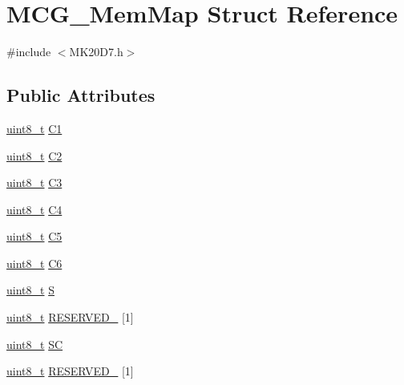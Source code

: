 \hypertarget{struct_m_c_g___mem_map}{}\section{M\+C\+G\+\_\+\+Mem\+Map Struct Reference}
\label{struct_m_c_g___mem_map}


{\ttfamily \#include $<$M\+K20\+D7.\+h$>$}

\subsection*{Public Attributes}
\begin{DoxyCompactItemize}
\item 
\hyperlink{_p_e___types_8h_aba7bc1797add20fe3efdf37ced1182c5}{uint8\+\_\+t} \hyperlink{struct_m_c_g___mem_map_a433a36d1aeb9d033b502ee263c1495a1}{C1}
\item 
\hyperlink{_p_e___types_8h_aba7bc1797add20fe3efdf37ced1182c5}{uint8\+\_\+t} \hyperlink{struct_m_c_g___mem_map_a7323696b9a1cb6631b8c04ffad3947e5}{C2}
\item 
\hyperlink{_p_e___types_8h_aba7bc1797add20fe3efdf37ced1182c5}{uint8\+\_\+t} \hyperlink{struct_m_c_g___mem_map_a58ca70b30279c98af3471abe38280f01}{C3}
\item 
\hyperlink{_p_e___types_8h_aba7bc1797add20fe3efdf37ced1182c5}{uint8\+\_\+t} \hyperlink{struct_m_c_g___mem_map_a3c5615d70ed3f2d3664de1a8fdbe9983}{C4}
\item 
\hyperlink{_p_e___types_8h_aba7bc1797add20fe3efdf37ced1182c5}{uint8\+\_\+t} \hyperlink{struct_m_c_g___mem_map_a0e385950fe0f38c82eae57eb4ea2aaf3}{C5}
\item 
\hyperlink{_p_e___types_8h_aba7bc1797add20fe3efdf37ced1182c5}{uint8\+\_\+t} \hyperlink{struct_m_c_g___mem_map_ae7f9f9ae65de91e230a236ca4629380c}{C6}
\item 
\hyperlink{_p_e___types_8h_aba7bc1797add20fe3efdf37ced1182c5}{uint8\+\_\+t} \hyperlink{struct_m_c_g___mem_map_a65ee0333e0d5c462c7dd8c2402bf93be}{S}
\item 
\hyperlink{_p_e___types_8h_aba7bc1797add20fe3efdf37ced1182c5}{uint8\+\_\+t} \hyperlink{struct_m_c_g___mem_map_a72b92c9f91e404fe22b998d80a558093}{R\+E\+S\+E\+R\+V\+E\+D\+\_} \mbox{[}1\mbox{]}
\item 
\hyperlink{_p_e___types_8h_aba7bc1797add20fe3efdf37ced1182c5}{uint8\+\_\+t} \hyperlink{struct_m_c_g___mem_map_aeff584aa52340d7c66dc06789ad05310}{SC}
\item 
\hyperlink{_p_e___types_8h_aba7bc1797add20fe3efdf37ced1182c5}{uint8\+\_\+t} \hyperlink{struct_m_c_g___mem_map_a7c3635946afd5f532fe4d46b340c4f4e}{R\+E\+S\+E\+R\+V\+E\+D\+\_} \mbox{[}1\mbox{]}

\end{DoxyCompactItemize}
